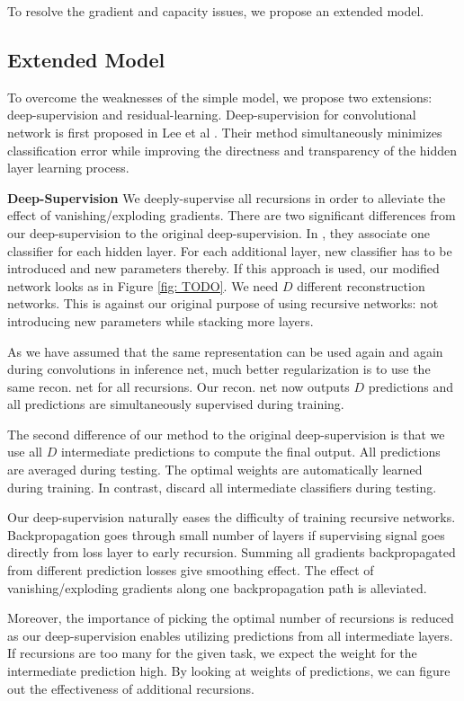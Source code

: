 \documentclass[10pt,twocolumn,letterpaper]{article}
\begin{document}
To resolve the gradient and capacity issues, we propose an extended model.

\subsection{Extended Model} 
To overcome the weaknesses of the simple model, we propose two extensions: deep-supervision and residual-learning. Deep-supervision for convolutional network is first proposed in Lee et al  \cite{lee2014deeply}. Their method simultaneously minimizes classification error while improving the directness and transparency of the hidden layer learning process.

\textbf{Deep-Supervision} We deeply-supervise all recursions in order to alleviate the effect of vanishing/exploding gradients. There are two significant differences from our deep-supervision to the original deep-supervision. In \cite{lee2014deeply}, they associate one classifier for each hidden layer. For each additional layer, new classifier has to be introduced and new parameters thereby. If this approach is used, our modified network looks as in Figure \ref{fig: TODO}. We need $D$ different reconstruction networks. This is against our original purpose of using recursive networks: not introducing new parameters while stacking more layers. 

As we have assumed that the same representation can be used again and again during convolutions in inference net, much better regularization is to use the same recon. net for all recursions. Our recon. net now outputs $D$ predictions and all predictions are simultaneously supervised during training. 

The second difference of our method to the original deep-supervision is that we use all $D$ intermediate predictions to compute the final output. All predictions are averaged during testing. The optimal weights are automatically learned during training. In contrast,  \cite{lee2014deeply} discard all intermediate classifiers during testing. 

Our deep-supervision naturally eases the difficulty of training recursive networks. Backpropagation goes through small number of layers if supervising signal goes directly from loss layer to early recursion. Summing all gradients backpropagated from different prediction losses give smoothing effect. The effect of vanishing/exploding gradients along one backpropagation path is alleviated.

Moreover, the importance of picking the optimal number of recursions is reduced as our deep-supervision enables utilizing predictions from all intermediate layers. If recursions are too many for the given task, we expect the weight for the intermediate prediction high. By looking at weights of predictions, we can figure out the effectiveness of additional recursions. 
\end{document}
